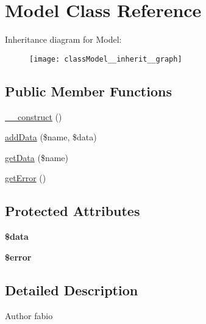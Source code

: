 \hypertarget{classModel}{\section{Model Class Reference}
\label{classModel}
}


Inheritance diagram for Model\+:\nopagebreak
\begin{figure}[H]
\begin{center}
\leavevmode
\texttt{[image: classModel\_\_inherit\_\_graph]}
\end{center}
\end{figure}
\subsection*{Public Member Functions}
\begin{DoxyCompactItemize}
\item 
\hyperlink{classModel_a655d64396144aad24a62132fa11b92ea}{\+\_\+\+\_\+construct} ()
\item 
\hyperlink{classModel_af422ec4a1428678240da4e751f942b9c}{add\+Data} (\$name, \$data)
\item 
\hyperlink{classModel_a8e1cba2731a082294561ce1b499f3402}{get\+Data} (\$name)
\item 
\hyperlink{classModel_a0372eec1043cef6e9b6a50220cb0b031}{get\+Error} ()
\end{DoxyCompactItemize}
\subsection*{Protected Attributes}
\begin{DoxyCompactItemize}
\item 
\hypertarget{classModel_ae04c729239482d90601ba5c9d6a4fc66}{{\bfseries \$data}}\label{classModel_ae04c729239482d90601ba5c9d6a4fc66}

\item 
\hypertarget{classModel_a4c02091587027b71fed8b3ff0a96748b}{{\bfseries \$error}}\label{classModel_a4c02091587027b71fed8b3ff0a96748b}

\end{DoxyCompactItemize}


\subsection{Detailed Description}
\begin{DoxyAuthor}{Author}
fabio 
\end{DoxyAuthor}


